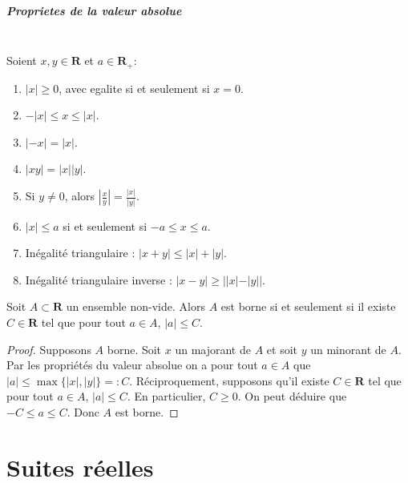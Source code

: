 \paragraph{Proprietes de la valeur absolue}~\\
Soient $x,y\in \mathbf{R}$ et $a\in \mathbf{R}_{+}$:
\begin{enumerate}
\item $|x|\ge 0$, avec egalite si et seulement si $x=0$.
\item $-|x|\le x\le |x|$.
\item $|-x|=|x|$.
\item $|xy|=|x||y|$.
\item Si $y\neq 0$, alors $\left\lvert  \frac{x}{y}  \right\rvert=\frac{|x|}{|y|}$.
\item $|x|\le a$ si et seulement si $-a\le x\le a$.
\item Inégalité triangulaire : $|x+y|\le |x|+|y|$.
\item Inégalité triangulaire inverse : $|x-y|\ge ||x|-|y||$.
\end{enumerate}
\begin{proposition}
Soit $A\subset \mathbf{R}$ un ensemble non-vide. Alors $A$ est borne si et seulement si il existe $C\in \mathbf{R}$ tel que pour tout $a\in A$, $|a|\le C$.
\end{proposition}
\begin{proof}
Supposons $A$ borne. Soit $x$ un majorant de $A$ et soit $y$ un minorant de $A$. Par les propriétés du valeur absolue on a pour tout $a\in A$ que $|a|\le \max\{ |x|,|y| \}=:C$. Réciproquement, supposons qu'il existe $C\in \mathbf{R}$ tel que pour tout $a\in A$, $|a|\le C$. En particulier, $C\ge 0$. On peut déduire que $-C\le a\le C$. Donc $A$ est borne.
\end{proof}

\chapter{Suites réelles}

